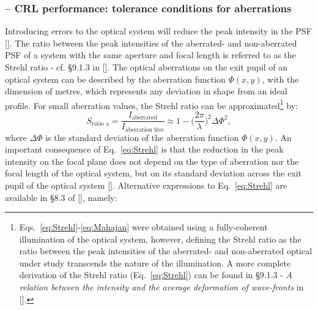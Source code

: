 \begin{refsection}

\subsubsection*{-- CRL performance: tolerance conditions for aberrations}

Introducing errors to the optical system will reduce the peak intensity in the PSF [\cite[\textit{\S8.2}]{Mahajan2011}]. The ratio between the peak intensities of the aberrated- and non-aberrated PSF of a system with the same aperture and focal length is referred to as the Strehl ratio - cf. \S9.1.3 in [\cite{born_wolf1999}]. The optical aberrations on the exit pupil of an optical system can be described by the aberration function $\Phi(x,y)$, with the dimension of metres, which represents any deviation in shape from an ideal profile. For small aberration values, the Strehl ratio can be approximated\footnote{Eqs.~\ref{eq:Strehl}-\ref{eq:Mahajan} were obtained using a fully-coherent illumination of the optical system, however, defining the Strehl ratio as the ratio between the peak intensities of the aberrated- and non-aberrated optical under study transcends the nature of the illumination. A more complete derivation of the Strehl ratio (Eq.~\ref{eq:Strehl}) can be found in \S9.1.3 - \textit{A relation between the intensity and the average deformation of wave-fronts} in [\cite{born_wolf1999}].} by:
\begin{equation}\label{eq:Strehl}
    S_{\text{ratio a}}=\frac{I_{\text{aberrated}}}{I_{\text{aberration free}}}\approx1-\bigg(\frac{2\pi}{\lambda}\bigg)^2\Delta\Phi^2,
\end{equation}{}
where $\Delta\Phi$ is the standard deviation of the aberration function $\Phi(x,y)$. An important consequence of Eq.~\ref{eq:Strehl} is that the reduction in the peak intensity on the focal plane does not depend on the type of aberration nor the focal length of the optical system, but on its standard deviation across the exit pupil of the optical system [\cite{born_wolf1999}]. Alternative expressions to Eq.~\ref{eq:Strehl} are available in \S8.3 of [\cite{Mahajan2011}], namely:

\end{refsection}
